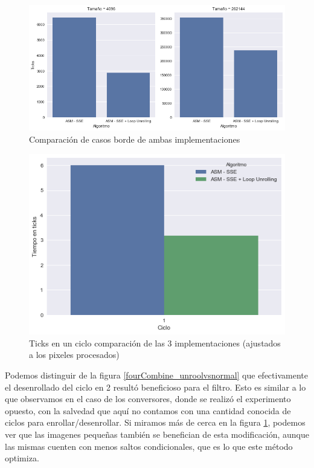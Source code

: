 \begin{figure}[H]
	\centering
	\includegraphics[scale=0.5]{img/fourCombine_UnrollvsNormal_bars.png}
	\caption{Comparación de casos borde de ambas implementaciones}
	\label{fourCombine_unroolvsnormal_bars}
\end{figure}

\begin{figure}[H]
	\centering
	\includegraphics[scale=0.5]{img/fourCombine_ticks_en_ciclo.png}
	\caption{Ticks en un ciclo comparación de las 3 implementaciones (ajustados a los pixeles procesados)}
	\label{fourCombine_ticksciclo}
\end{figure}

Podemos distinguir de la figura \ref{fourCombine_unroolvsnormal} que efectivamente el desenrollado del ciclo en 2 resultó beneficioso para el filtro. Esto es similar a lo que observamos en el caso de los conversores, donde se realizó el experimento opuesto, con la salvedad que aquí no contamos con una cantidad conocida de ciclos para enrollar/desenrollar. Si miramos más de cerca en la figura \ref{fourCombine_unroolvsnormal_bars}, podemos ver que las imagenes pequeñas también se benefician de esta modificación, aunque las mismas cuenten con menos saltos condicionales, que es lo que este método optimiza.

